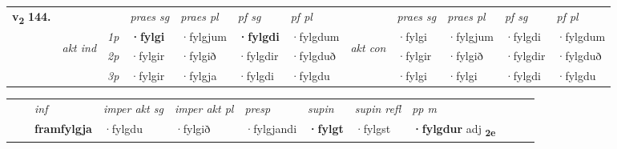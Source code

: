 \begin{tabular}{llllllllllll} \toprule
\multirow{4}{*}{{{\textbf{v{\textsubscript{2}}} \Large{\textbf{144.}}}}}  & &   &  \textit{praes sg}  & \textit{praes pl}  &\textit{ pf sg} & \textit{pf pl} &  &  \textit{praes sg}  & \textit{praes pl}  & \textit{pf sg} & \textit{pf pl } \\*
	\cmidrule{4-7} \cmidrule{9-12}
 & \multirow{3}{*}{\begin{turn}{90}\textit{akt ind}\end{turn}} & {\textit{1p}} & \textbf{·fylgi} & ·fylgjum    & \textbf{·fylgdi} & ·fylgdum & \multirow{3}{*}{\begin{turn}{90}\textit{akt con}\end{turn}} &·fylgi & ·fylgjum & ·fylgdi & ·fylgdum\\*
& &  {\textit{2p}} &  ·fylgir  & ·fylgið   & ·fylgdir & ·fylgduð & & ·fylgir & ·fylgið & ·fylgdir & ·fylgduð \\*
& &  {\textit{3p}} & ·fylgir & ·fylgja   & ·fylgdi & ·fylgdu & & ·fylgi & ·fylgi& ·fylgdi & ·fylgdu  \\*
\cmidrule{4-7} \cmidrule{9-12}
\end{tabular}


\begin{tabular}{llllllllllll}
 & & \textit{inf} & \textit{imper akt sg} & \textit{imper akt pl}   & \textit{presp} & \textit{supin} & \textit{supin refl} & \textit{pp m}     \\*
  & & \textbf{framfylgja} & ·fylgdu  & ·fylgið   & ·fylgjandi &  \textbf{·fylgt} & ·fylgst & \textbf{·fylgdur} adj \textbf{\textsubscript{2e}} \\*
\cmidrule{1-12}
\end{tabular}



